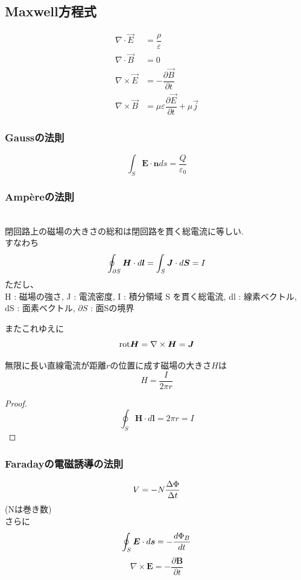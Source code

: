 \documentclass[dvipdfmx,uplatex]{jsarticle}
\begin{document}
\subsection{Maxwell方程式}
\begin{law}
\begin{align}
\nabla \cdot \vec{E} &= \dfrac{\rho}{\varepsilon}\\
\nabla \cdot \vec{B} &= 0\\
\nabla \times \vec{E} &= -\dfrac{\partial \vec{B}}{\partial t}\\
\nabla \times \vec{B} &= \mu\varepsilon \dfrac{\partial \vec{E}}{\partial t} + \mu\vec{j}
\end{align}
\end{law}

\subsubsection{Gaussの法則}
\begin{law}
\[
\int_S \bm{E} \cdot \bm{n} ds = \frac{Q}{\varepsilon _0}
\]
\end{law}

\subsubsection{Amp\`{e}reの法則}
\begin{law}[アンペールの法則] \mbox{}\\
閉回路上の磁場の大きさの総和は閉回路を貫く総電流に等しい. \\
すなわち
\[
\oint_{\partial S} \bm{H} \cdot d \bm{l} = \int_S \bm{J} \cdot d \bm{S} = I \\
\]
ただし、\\
H	: 磁場の強さ,
J	: 電流密度,
I	: 積分領域 S を貫く総電流,
dl	: 線素ベクトル,
dS	: 面素ベクトル,
$\partial S$	: 面Sの境界 \\
\end{law}
またこれゆえに
\[
\mathrm{rot} \bm{H} = \nabla \times \bm{H} = \bm{J} \\
\]
\begin{theo}
無限に長い直線電流が距離$r$の位置に成す磁場の大きさ$H$は
\[
H = \frac{I}{2 \pi r}
\]
\end{theo}
\begin{proof}
\[
\oint_S  \bm{H} \cdot d \bm{l} = 2 \pi r = I
\]
\end{proof}

\subsubsection{Faradayの電磁誘導の法則}
\begin{law}
\[
V = -N \frac{\Delta \Phi}{\Delta t} \\
\]
(Nは巻き数)\\
さらに
\[
\oint_S \bm{E} \cdot d\bm{s} = - \frac{d \Phi _B}{dt}\\
\]
\[
\nabla \times \bm{E} = - \frac{\partial \bm{B}}{\partial t}
\]
\end{law}
\end{document}
